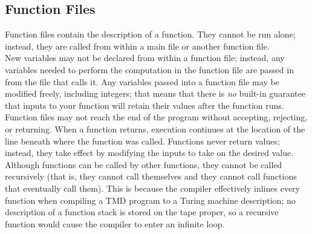 \documentclass{report}
\begin{document}
\subsection{Function Files}

Function files contain the description of a function. They cannot be run alone; instead, they are called from within a main file or another function file. \\
  
New variables may not be declared from within a function file; instead, any variables needed to perform the computation in the function file are passed in from the file that calls it. Any variables passed into a function file may be modified freely, including integers; that means that there is \emph{no} built-in guarantee that inputs to your function will retain their values after the function runs. \\

Function files may not reach the end of the program without accepting, rejecting, or returning. When a function returns, execution continues at the location of the line beneath where the function was called. Functions never return values; instead, they take effect by modifying the inputs to take on the desired value. \\

Although functions can be called by other functions, they cannot be called recursively (that is, they cannot call themselves and they cannot call functions that eventually call them). This is because the compiler effectively inlines every function when compiling a TMD program to a Turing machine description; no description of a function stack is stored on the tape proper, so a recursive function would cause the compiler to enter an infinite loop. \\
\end{document}
